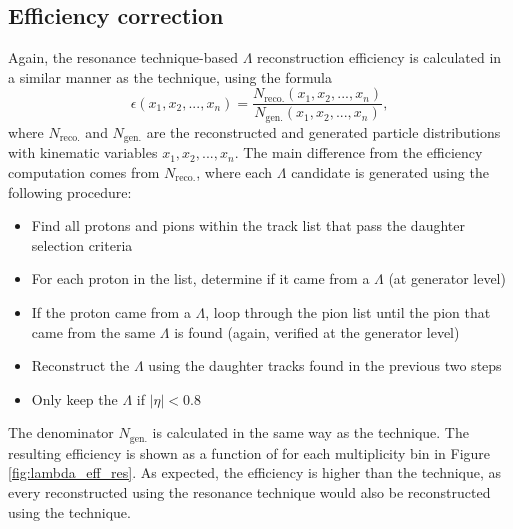 \subsection{Efficiency correction}
Again, the resonance technique-based $\Lambda$ reconstruction efficiency is calculated in a similar manner as the \vz technique, using the formula
%
\begin{equation}
	\epsilon(x_1, x_2, ..., x_n) = \frac{N_{\text{reco.}}(x_1, x_2, ..., x_n)}{N_{\text{gen.}}(x_1, x_2, ..., x_n)},
	\label{eq:efficiency_exp_2}
\end{equation}
%
where $N_{\text{reco.}}$ and $N_{\text{gen.}}$ are the reconstructed and generated particle distributions with kinematic variables $x_1, x_2, ..., x_n$. The main difference from the \vz efficiency computation comes from $N_{\text{reco.}}$, where
each $\Lambda$ candidate is generated using the following procedure:
%
\begin{itemize}
	\item Find all protons and pions within the track list that pass the daughter selection criteria
	\item For each proton in the list, determine if it came from a $\Lambda$ (at generator level)
	\item If the proton came from a $\Lambda$, loop through the pion list until the pion that came from the same $\Lambda$ is found (again, verified at the generator level)
	\item Reconstruct the $\Lambda$ using the daughter tracks found in the previous two steps
	\item Only keep the $\Lambda$ if $|\eta| < 0.8$
\end{itemize}
%
The denominator $N_{\text{gen.}}$ is calculated in the same way as the \vz technique. The resulting efficiency is shown as a function of \pt for each multiplicity bin in Figure \ref{fig:lambda_eff_res}. As expected, the efficiency is higher than the \vz technique, as every \lmb reconstructed using the resonance technique would also be reconstructed using the \vz technique.

